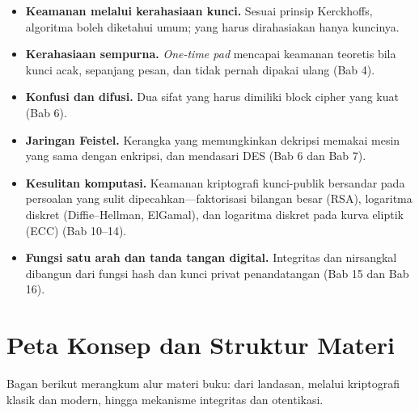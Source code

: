 \documentclass[../main.tex]{subfiles}
\begin{document}
\begin{itemize}
    \item \textbf{Keamanan melalui kerahasiaan kunci.} Sesuai prinsip Kerckhoffs,
          algoritma boleh diketahui umum; yang harus dirahasiakan hanya kuncinya.
    \item \textbf{Kerahasiaan sempurna.} \textit{One-time pad} mencapai keamanan
          teoretis bila kunci acak, sepanjang pesan, dan tidak pernah dipakai
          ulang (Bab 4).
    \item \textbf{Konfusi dan difusi.} Dua sifat yang harus dimiliki block
          cipher yang kuat (Bab 6).
    \item \textbf{Jaringan Feistel.} Kerangka yang memungkinkan dekripsi memakai
          mesin yang sama dengan enkripsi, dan mendasari DES (Bab 6 dan Bab 7).
    \item \textbf{Kesulitan komputasi.} Keamanan kriptografi kunci-publik
          bersandar pada persoalan yang sulit dipecahkan---faktorisasi bilangan
          besar (RSA), logaritma diskret (Diffie--Hellman, ElGamal), dan
          logaritma diskret pada kurva eliptik (ECC) (Bab 10--14).
    \item \textbf{Fungsi satu arah dan tanda tangan digital.} Integritas dan
          nirsangkal dibangun dari fungsi hash dan kunci privat penandatangan
          (Bab 15 dan Bab 16).
\end{itemize}

\section*{Peta Konsep dan Struktur Materi}

Bagan berikut merangkum alur materi buku: dari landasan, melalui kriptografi
klasik dan modern, hingga mekanisme integritas dan otentikasi.

\begin{center}
\end{center}
\end{document}
